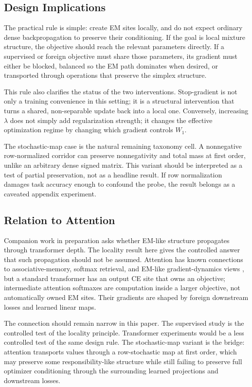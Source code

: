 \subsection{Design Implications}
The practical rule is simple: create EM sites locally, and do not expect
ordinary dense backpropagation to preserve their conditioning. If the goal is
local mixture structure, the objective should reach the relevant parameters
directly. If a supervised or foreign objective must share those parameters,
its gradient must either be blocked, balanced so the EM path dominates when
desired, or transported through operations that preserve the simplex
structure.

This rule also clarifies the status of the two interventions. Stop-gradient is
not only a training convenience in this setting; it is a structural
intervention that turns a shared, non-separable update back into a local one.
Conversely, increasing $\lambda$ does not simply add regularization strength;
it changes the effective optimization regime by changing which gradient
controls $W_1$.

The stochastic-map case is the natural remaining taxonomy cell. A nonnegative
row-normalized corridor can preserve nonnegativity and total mass at first
order, unlike an arbitrary dense signed matrix. This variant should be
interpreted as a test of partial preservation, not as a headline result. If
row normalization damages task accuracy enough to confound the probe, the
result belongs as a caveated appendix experiment.

\subsection{Relation to Attention}
Companion work in preparation asks whether EM-like structure propagates
through transformer depth. The locality result here gives the controlled
answer that such propagation should not be assumed. Attention has known
connections to associative-memory, softmax retrieval, and EM-like
gradient-dynamics views \citep{ramsauer2021hopfield,agarwal2025gradient}, but
a standard transformer has an output CE site
that owns an objective; intermediate attention softmaxes are computation
inside a larger objective, not automatically owned EM sites. Their gradients
are shaped by foreign downstream losses and learned linear maps.

The connection should remain narrow in this paper. The supervised study is the
controlled test of the locality principle. Transformer experiments would be a
less controlled test of the same design rule. The stochastic-map variant is
the bridge: attention transports values through a row-stochastic map at first
order, which may preserve some responsibility-like structure while still
failing to preserve full optimizer conditioning through the surrounding
learned projections and downstream losses.
